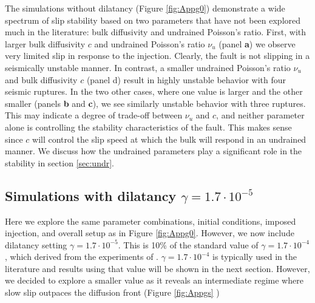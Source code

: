 \documentclass[draft]{agujournal2019}
\begin{document}
The simulations without dilatancy (Figure \ref{fig:Appg0}) demonstrate a wide spectrum of slip stability based on two parameters that have not been explored much in the literature: bulk diffusivity and undrained Poisson's ratio. First, with larger bulk diffusivity $c$ and undrained Poisson's ratio $\nu_u$ (panel {\bf a}) we observe very limited slip in response to the injection. Clearly, the fault is not slipping in a seismically unstable manner. In contrast, a smaller undrained Poisson's ratio $\nu_u$ and bulk diffusivity $c$ (panel d) result in highly unstable behavior with four seismic ruptures. In the two other cases, where one value is larger and the other smaller (panels {\bf b} and {\bf c}), we see similarly unstable behavior with three ruptures. This may indicate a degree of trade-off between  $\nu_u$ and $c$, and neither parameter alone is controlling the stability characteristics of the fault. This makes sense since $c$ will control the slip speed at which the bulk will respond in an undrained manner. We discuss how the undrained parameters play a significant role in the stability in section \ref{sec:undr}.

\subsection{Simulations with dilatancy $\gamma = 1.7 \cdot 10^{-5}$}

Here we explore the same parameter combinations, initial conditions, imposed injection, and overall setup as in Figure \ref{fig:Appg0}. However, we now include dilatancy setting $\gamma = 1.7 \cdot 10^{-5}$. This is 10\% of the standard value of $\gamma = 1.7 \cdot 10^{-4}$, which  derived from the experiments of . $\gamma = 1.7 \cdot 10^{-4}$ is typically used in the literature and results using that value will be shown in the next section. However, we decided to explore a smaller value as it reveals an intermediate regime where slow slip outpaces the diffusion front (Figure \ref{fig:Appgs} )
\end{document}
